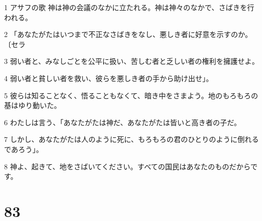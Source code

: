 \par 1 アサフの歌 神は神の会議のなかに立たれる。神は神々のなかで、さばきを行われる。
\par 2 「あなたがたはいつまで不正なさばきをなし、悪しき者に好意を示すのか。〔セラ
\par 3 弱い者と、みなしごとを公平に扱い、苦しむ者と乏しい者の権利を擁護せよ。
\par 4 弱い者と貧しい者を救い、彼らを悪しき者の手から助け出せ」。
\par 5 彼らは知ることなく、悟ることもなくて、暗き中をさまよう。地のもろもろの基はゆり動いた。
\par 6 わたしは言う、「あなたがたは神だ、あなたがたは皆いと高き者の子だ。
\par 7 しかし、あなたがたは人のように死に、もろもろの君のひとりのように倒れるであろう」。
\par 8 神よ、起きて、地をさばいてください。すべての国民はあなたのものだからです。

\chapter{83}

